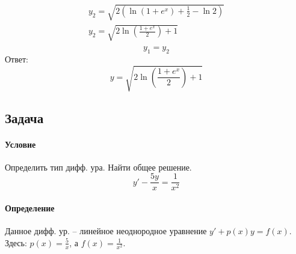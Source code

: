 \begin{gather*}
	y_2 = \sqrt{2(\ln{(1 + e^x)}  + \frac{1}{2} - \ln{2})} \\
	y_2 = \sqrt{2\ln\left(\frac{1 + e^x}{2}\right) + 1} \\
\end{gather*}
\[y_1 = y_2\]
Ответ:
\[y = \sqrt{2\ln\left(\frac{1 + e^x}{2}\right) + 1}\]

\subsection{Задача }
\paragraph{Условие}
Определить тип дифф. ура. Найти общее решение.
\begin{equation} \label{eq:statement}
	y' - \frac{5y}{x} = \frac{1}{x^2}
\end{equation}

\paragraph{Определение}
Данное дифф. ур. -- линейное неоднородное уравнение $y'+ p(x)y = f(x)$. \\
Здесь: $p(x) = \frac{5}{x}$, а $f(x) = \frac{1}{x^2}$.

